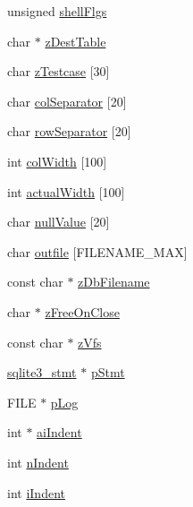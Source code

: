 \begin{DoxyCompactItemize}
\item 
unsigned \hyperlink{struct_shell_state_a970dc91433f4d8d1c6776d2eb9753c6f}{shell\+Flgs}
\item 
char $\ast$ \hyperlink{struct_shell_state_a1019f63cae8d412dc13a06bb80562247}{z\+Dest\+Table}
\item 
char \hyperlink{struct_shell_state_a8c9b32aa186f1b581fc57f324cad108e}{z\+Testcase} \mbox{[}30\mbox{]}
\item 
char \hyperlink{struct_shell_state_ae9d5cc638c180de0798aeee4f17b416b}{col\+Separator} \mbox{[}20\mbox{]}
\item 
char \hyperlink{struct_shell_state_a576a4b6fd62786683bafb6c7631eae6f}{row\+Separator} \mbox{[}20\mbox{]}
\item 
int \hyperlink{struct_shell_state_adf07d77efc02d83f1c42500ef6a4c433}{col\+Width} \mbox{[}100\mbox{]}
\item 
int \hyperlink{struct_shell_state_ae5e87296fedf861b6013c48f20888c2b}{actual\+Width} \mbox{[}100\mbox{]}
\item 
char \hyperlink{struct_shell_state_a6ae47309eca991773424ffd6b6dd3170}{null\+Value} \mbox{[}20\mbox{]}
\item 
char \hyperlink{struct_shell_state_ab1901d796d12c9fe4859f954fba74235}{outfile} \mbox{[}F\+I\+L\+E\+N\+A\+M\+E\+\_\+\+M\+AX\mbox{]}
\item 
const char $\ast$ \hyperlink{struct_shell_state_a8b887b0d2047997012969639cec7aec1}{z\+Db\+Filename}
\item 
char $\ast$ \hyperlink{struct_shell_state_acd5673a65d8d4aa5a5a674e4ad8a374b}{z\+Free\+On\+Close}
\item 
const char $\ast$ \hyperlink{struct_shell_state_a7a17ec105e801f6d466f3dd8e29521e6}{z\+Vfs}
\item 
\hyperlink{sqlite3_8h_af2a033da1327cdd77f0a174a09aedd0c}{sqlite3\+\_\+stmt} $\ast$ \hyperlink{struct_shell_state_a443b930c7001c9b669728b917c2f5587}{p\+Stmt}
\item 
F\+I\+LE $\ast$ \hyperlink{struct_shell_state_a9ca42a0d7bf19e576de8ea13ba40b61c}{p\+Log}
\item 
int $\ast$ \hyperlink{struct_shell_state_a0481fdd4a0c88fb17f1a66ba87939ce9}{ai\+Indent}
\item 
int \hyperlink{struct_shell_state_a73e3fe627474f4de6c0e04837ee0b0bd}{n\+Indent}
\item 
int \hyperlink{struct_shell_state_a08d5d59ae0d44497aca79e89a5b8f0fe}{i\+Indent}
\end{DoxyCompactItemize}


